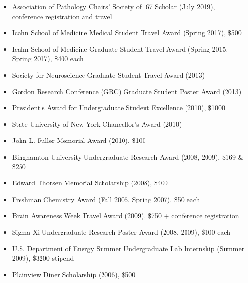 \documentclass[10pt]{article}
\begin{document}
\begin{itemize}
  \item Association of Pathology Chairs' Society of '67 Scholar (July 2019), conference registration and travel
  \item Icahn School of Medicine Medical Student Travel Award (Spring 2017), \$500
  \item Icahn School of Medicine Graduate Student Travel Award (Spring 2015, Spring 2017), \$400 each
  \item Society for Neuroscience Graduate Student Travel Award (2013)
  \item Gordon Research Conference (GRC) Graduate Student Poster Award (2013)
  \item President's Award for Undergraduate Student Excellence (2010), \$1000
  \item State University of New York Chancellor's Award (2010)
  \item John L. Fuller Memorial Award (2010), \$100
  \item Binghamton University Undergraduate Research Award (2008, 2009), \$169 \& \$250
  \item Edward Thorsen Memorial Scholarship (2008), \$400
  \item Freshman Chemistry Award (Fall 2006, Spring 2007), \$50 each
  \item Brain Awareness Week Travel Award (2009), \$750 + conference registration
  \item Sigma Xi Undergraduate Research Poster Award (2008, 2009), \$100 each
  \item U.S. Department of Energy Summer Undergraduate Lab Internship (Summer 2009), \$3200 stipend
  \item Plainview Diner Scholarship (2006), \$500

\end{itemize}
\end{document}
